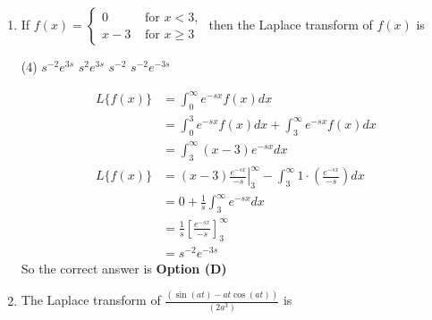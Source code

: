 \begin{enumerate}
	\begin{tasks}(4)
		\task[\textbf{A.}] $\frac{1}{(s+a)(s+b)}$
		\task[\textbf{B.}] $\frac{1}{b(s+a)}$
		\task[\textbf{C.}] $\frac{1}{a(s+b)}$
		\task[\textbf{D.}] $\frac{e^{-a}-e^{-b}}{b-a}$
	\end{tasks}
	\begin{answer}
		\begin{align*}
		\text{Given }\frac{d y}{d t}+a y&=e^{-b t}
		\intertext{Taking Laplace transform of both sides}
		\text{	We obtain}\\
		L\left\{\frac{d y}{d t}\right\}+a L\{y(t)\}&=L\left\{e^{-b t}\right\} \Rightarrow s Y(s)-y(0)+a Y(s)=\frac{1}{s+b}\\
		\text{Since, }	y(0)&=0,\text{ we obtain}\\
		(s+a) Y(s)&=\frac{1}{s+b} \\ Y(s)&=\frac{1}{(s+a)(s+b)}
		\end{align*}
		So the correct answer is \textbf{Option (A)}
	\end{answer}
	\item If $f(x)=\left\{\begin{array}{ll}0 & \text { for } x<3, \\ x-3 & \text { for } x \geq 3\end{array}\right.$ then the Laplace transform of $f(x)$ is
	{}
	
	\begin{tasks}(4)
		\task[\textbf{A.}] $s^{-2} e^{3 s}$
		\task[\textbf{B.}] $s^{2} e^{3 s}$
		\task[\textbf{C.}] $s^{-2}$
		\task[\textbf{D.}] $s^{-2} e^{-3 s}$
	\end{tasks}
	\begin{answer}
		\begin{align*}
		L\{f(x)\}&=\int_{0}^{\infty} e^{-s x} f(x) d x\\&=\int_{0}^{3} e^{-s x} f(x) d x+\int_{3}^{\infty} e^{-s x} f(x) d x\\&=\int_{3}^{\infty}(x-3) e^{-s x} d x\\
		L\{f(x)\}&=\left.(x-3) \frac{e^{-s x}}{-s}\right|_{3} ^{\infty}-\int_{3}^{\infty} 1 \cdot\left(\frac{e^{-s x}}{-s}\right) d x\\&=0+\frac{1}{s} \int_{3}^{\infty} e^{-s x} d x\\&=\frac{1}{s}\left[\frac{e^{-s x}}{-s}\right]_{3}^{\infty}\\&=s^{-2} e^{-3 s}
		\end{align*}
		So the correct answer is \textbf{Option (D)}
	\end{answer}
	\item The Laplace transform of $\frac{(\sin (a t)-a t \cos (a t))}{\left(2 a^{3}\right)}$ is 
	{}
	

\end{enumerate}
